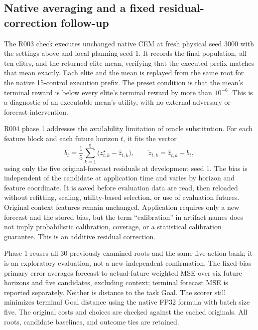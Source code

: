\documentclass[11pt]{article}
\begin{document}
\subsection{Native averaging and a fixed residual-correction follow-up}
\label{sec:followup-protocol}
The R003 check executes unchanged native CEM at fresh physical seed 3000 with
the settings above and local planning seed 1. It records the final population,
all ten elites, and the returned elite mean, verifying that the executed prefix
matches that mean exactly. Each elite and the mean is replayed from the same
root for the native 15-control execution prefix. The preset condition is
that the mean's terminal reward is below every elite's terminal reward by
more than $10^{-6}$. This is a diagnostic of an executable mean's utility,
with no external adversary or forecast intervention.

R004 phase 1 addresses the availability limitation of oracle substitution.
For each feature block and each future horizon $t$, it fits the vector
\begin{equation}
 b_t=\frac{1}{5}\sum_{k=1}^{5}
       \bigl(z^\star_{t,k}-\widehat z_{t,k}\bigr),
 \qquad \widetilde z_{t,k}=\widehat z_{t,k}+b_t,
 \label{eq:fixed-bias}
\end{equation}
using only the five original-forecast residuals at development seed 1. The
bias is independent of the candidate at application time and varies by
horizon and feature coordinate. It is saved before evaluation data are read,
then reloaded without refitting, scaling, utility-based selection, or use of
evaluation futures. Original context features remain unchanged. Application
requires only a new forecast and the stored bias, but the term ``calibration''
in artifact names does not imply probabilistic calibration, coverage, or a
statistical calibration guarantee. This is an additive residual correction.

Phase 1 reuses all 30 previously examined roots and the same five-action bank;
it is an exploratory evaluation, not a new independent confirmation. The
fixed-bias primary error averages forecast-to-actual-future weighted MSE over
six future horizons and five candidates, excluding context; terminal forecast
MSE is reported separately. Neither is distance to the task Goal. The scorer
still minimizes terminal Goal distance using the native FP32 formula with
batch size five. The original costs and choices are checked against the
cached originals. All roots, candidate baselines, and outcome ties are retained.
\end{document}
